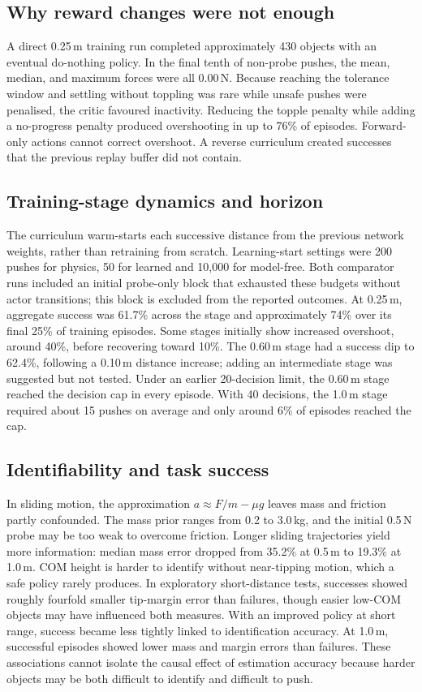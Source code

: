 \documentclass[12pt]{article}
\begin{document}
\subsection{Why reward changes were not enough}
A direct 0.25\,m training run completed approximately 430 objects with an eventual do-nothing policy. In the final tenth of non-probe pushes, the mean, median, and maximum forces were all 0.00\,N. Because reaching the tolerance window and settling without toppling was rare while unsafe pushes were penalised, the critic favoured inactivity. Reducing the topple penalty while adding a no-progress penalty produced overshooting in up to 76\% of episodes. Forward-only actions cannot correct overshoot. A reverse curriculum created successes that the previous replay buffer did not contain.

\subsection{Training-stage dynamics and horizon}
The curriculum warm-starts each successive distance from the previous network weights, rather than retraining from scratch. Learning-start settings were 200 pushes for physics, 50 for learned and 10,000 for model-free. Both comparator runs included an initial probe-only block that exhausted these budgets without actor transitions; this block is excluded from the reported outcomes. At 0.25\,m, aggregate success was 61.7\% across the stage and approximately 74\% over its final 25\% of training episodes. Some stages initially show increased overshoot, around 40\%, before recovering toward 10\%. The 0.60\,m stage had a success dip to 62.4\%, following a 0.10\,m distance increase; adding an intermediate stage was suggested but not tested. Under an earlier 20-decision limit, the 0.60\,m stage reached the decision cap in every episode. With 40 decisions, the 1.0\,m stage required about 15 pushes on average and only around 6\% of episodes reached the cap.

\subsection{Identifiability and task success}
In sliding motion, the approximation $a\approx F/m-\mu g$ leaves mass and friction partly confounded. The mass prior ranges from 0.2 to 3.0\,kg, and the initial 0.5\,N probe may be too weak to overcome friction. Longer sliding trajectories yield more information: median mass error dropped from 35.2\% at 0.5\,m to 19.3\% at 1.0\,m. COM height is harder to identify without near-tipping motion, which a safe policy rarely produces. In exploratory short-distance tests, successes showed roughly fourfold smaller tip-margin error than failures, though easier low-COM objects may have influenced both measures. With an improved policy at short range, success became less tightly linked to identification accuracy. At 1.0\,m, successful episodes showed lower mass and margin errors than failures. These associations cannot isolate the causal effect of estimation accuracy because harder objects may be both difficult to identify and difficult to push.
\end{document}
